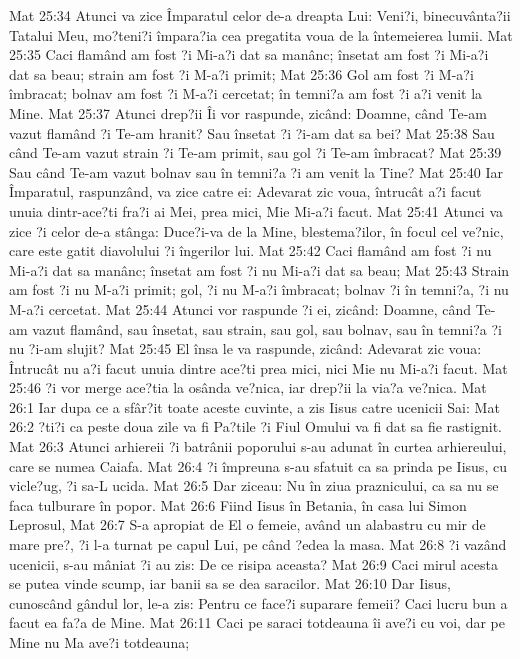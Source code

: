Mat 25:34  Atunci va zice Împaratul celor de-a dreapta Lui: Veni?i, binecuvânta?ii Tatalui Meu, mo?teni?i împara?ia cea pregatita voua de la întemeierea lumii.
Mat 25:35  Caci flamând am fost ?i Mi-a?i dat sa manânc; însetat am fost ?i Mi-a?i dat sa beau; strain am fost ?i M-a?i primit;
Mat 25:36  Gol am fost ?i M-a?i îmbracat; bolnav am fost ?i M-a?i cercetat; în temni?a am fost ?i a?i venit la Mine.
Mat 25:37  Atunci drep?ii Îi vor raspunde, zicând: Doamne, când Te-am vazut flamând ?i Te-am hranit? Sau însetat ?i ?i-am dat sa bei?
Mat 25:38  Sau când Te-am vazut strain ?i Te-am primit, sau gol ?i Te-am îmbracat?
Mat 25:39  Sau când Te-am vazut bolnav sau în temni?a ?i am venit la Tine?
Mat 25:40  Iar Împaratul, raspunzând, va zice catre ei: Adevarat zic voua, întrucât a?i facut unuia dintr-ace?ti fra?i ai Mei, prea mici, Mie Mi-a?i facut.
Mat 25:41  Atunci va zice ?i celor de-a stânga: Duce?i-va de la Mine, blestema?ilor, în focul cel ve?nic, care este gatit diavolului ?i îngerilor lui.
Mat 25:42  Caci flamând am fost ?i nu Mi-a?i dat sa manânc; însetat am fost ?i nu Mi-a?i dat sa beau;
Mat 25:43  Strain am fost ?i nu M-a?i primit; gol, ?i nu M-a?i îmbracat; bolnav ?i în temni?a, ?i nu M-a?i cercetat.
Mat 25:44  Atunci vor raspunde ?i ei, zicând: Doamne, când Te-am vazut flamând, sau însetat, sau strain, sau gol, sau bolnav, sau în temni?a ?i nu ?i-am slujit?
Mat 25:45  El însa le va raspunde, zicând: Adevarat zic voua: Întrucât nu a?i facut unuia dintre ace?ti prea mici, nici Mie nu Mi-a?i facut.
Mat 25:46  ?i vor merge ace?tia la osânda ve?nica, iar drep?ii la via?a ve?nica.
Mat 26:1  Iar dupa ce a sfâr?it toate aceste cuvinte, a zis Iisus catre ucenicii Sai:
Mat 26:2  ?ti?i ca peste doua zile va fi Pa?tile ?i Fiul Omului va fi dat sa fie rastignit.
Mat 26:3  Atunci arhiereii ?i batrânii poporului s-au adunat în curtea arhiereului, care se numea Caiafa.
Mat 26:4  ?i împreuna s-au sfatuit ca sa prinda pe Iisus, cu vicle?ug, ?i sa-L ucida.
Mat 26:5  Dar ziceau: Nu în ziua praznicului, ca sa nu se faca tulburare în popor.
Mat 26:6  Fiind Iisus în Betania, în casa lui Simon Leprosul,
Mat 26:7  S-a apropiat de El o femeie, având un alabastru cu mir de mare pre?, ?i l-a turnat pe capul Lui, pe când ?edea la masa.
Mat 26:8  ?i vazând ucenicii, s-au mâniat ?i au zis: De ce risipa aceasta?
Mat 26:9  Caci mirul acesta se putea vinde scump, iar banii sa se dea saracilor.
Mat 26:10  Dar Iisus, cunoscând gândul lor, le-a zis: Pentru ce face?i suparare femeii? Caci lucru bun a facut ea fa?a de Mine.
Mat 26:11  Caci pe saraci totdeauna îi ave?i cu voi, dar pe Mine nu Ma ave?i totdeauna;
